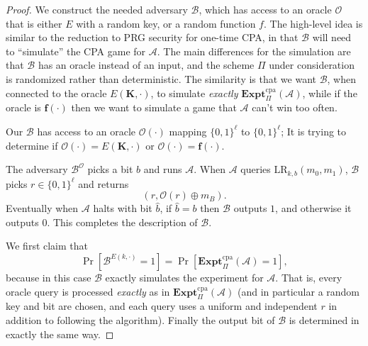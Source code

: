 \documentclass[11pt]{article}
\newcommand{\calA}{\mathcal{A}}
\newcommand{\calB}{\mathcal{B}}
\newcommand{\calO}{\mathcal{O}}
\newcommand{\bits}{\{0,1\}}
\newcommand{\bK}{\mathbf{K}}
\newcommand{\bof}{\mathbf{f}}
\newcommand{\ExptCPA}{\mathbf{Expt}^{\mathrm{cpa}}}
\newcommand{\LR}{\mathrm{LR}}
\begin{document}
\begin{proof}
	We construct the needed adversary $\calB$, which has access to an oracle
	$\calO$ that is either $E$ with a random key, or a random function $f$.
	The high-level idea is similar to the reduction to PRG security for
	one-time CPA, in that $\calB$ will need to ``simulate'' the CPA game for
	$\calA$. The main differences for the simulation are that $\calB$ has an
	oracle instead of an input, and the scheme $\Pi$ under consideration is
	randomized rather than deterministic. The similarity is that we want
	$\calB$, when connected to the oracle $E(\bK,\cdot)$, to simulate
	\emph{exactly} $\ExptCPA_{\Pi}(\calA)$, while if the oracle is
	$\bof(\cdot)$ then we want to simulate a game that $\calA$ can't win
	too often.
	
	Our $\calB$ has access to an oracle $\calO(\cdot)$ mapping $\bits^\ell$ to
	$\bits^\ell$; It is trying to determine if $\calO(\cdot)=E(\bK,\cdot)$
	or $\calO(\cdot)=\bof(\cdot)$.
	
	The adversary $\calB^\calO$
	picks a bit $b$ and runs $\calA$. 
	When $\calA$ queries $\LR_{k,b}(m_0,m_1)$,
	$\calB$ picks $r\in\bits^\ell$ and returns
	\[
	(r, \calO(r)\oplus m_B).
	\]
	Eventually when $\calA$ halts with bit $\hat{b}$, if $\hat{b}=b$ then
	$\calB$ outputs $1$, and otherwise it outputs $0$. This completes
	the description of $\calB$.
	
	We first claim that 
	\[
	\Pr[\calB^{E(k,\cdot)}=1] = \Pr[\ExptCPA_{\Pi}(\calA)=1],
	\]
	because in this case $\calB$ exactly simulates the experiment
	for $\calA$. That is, every oracle query is processed \emph{exactly}
	as in $\ExptCPA_{\Pi}(\calA)$ (and in particular a random key and bit are
	chosen, and each query uses a uniform and independent $r$ in addition to
	following the algorithm). Finally the output bit of $\calB$ is determined
	in exactly the same way.
	

\end{proof}
\end{document}

